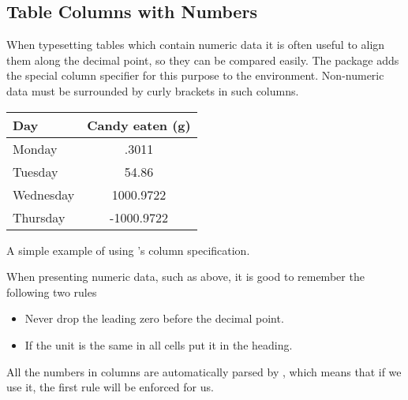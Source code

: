 \subsection{Table Columns with Numbers}\label{sec:sitables}

When typesetting tables which contain numeric data it is often useful to align
them along the decimal point, so they can be compared easily. The 
package adds the special column specifier  for this purpose to the
 environment. Non-numeric data must be surrounded by curly brackets
in such columns.
\begin{listing}
  \begin{example}[examplewidth=0.7\linewidth, vertical_mode]
\begin{tabular}{@{}lS@{}}
  \toprule
  Day       & {Candy eaten (\unit{\g})} \\
  \midrule
  Monday    & .3011                     \\
  Tuesday   & 54.86                     \\
  Wednesday & 1000.9722                 \\
  Thursday  & -1000.9722                \\
  \bottomrule
\end{tabular}
\end{example}
  \caption{A simple example of using 's  column
    specification.}
\end{listing}

When presenting numeric data, such as above, it is good to remember the
following two rules
\begin{itemize}
  \item Never drop the leading zero before the decimal point.
  \item If the unit is the same in all cells put it in the heading.
\end{itemize}
All the numbers in  columns are automatically parsed by ,
which means that if we use it, the first rule will be enforced for us.

